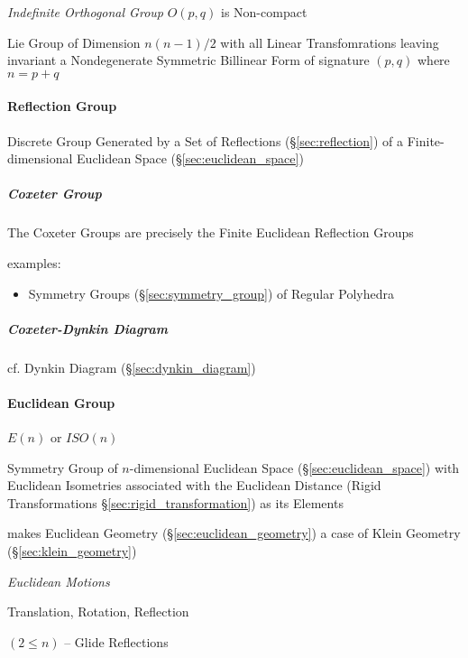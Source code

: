 \emph{Indefinite Orthogonal Group} $O(p,q)$ is Non-compact

Lie Group of Dimension $n(n-1)/2$ with all Linear Transfomrations leaving
invariant a Nondegenerate Symmetric Billinear Form of signature $(p,q)$ where
$n = p+q$



\paragraph{Reflection Group}\label{sec:reflection_group}\hfill

Discrete Group Generated by a Set of Reflections (\S\ref{sec:reflection}) of a
Finite-dimensional Euclidean Space (\S\ref{sec:euclidean_space})



\subparagraph{Coxeter Group}\label{sec:coxeter_group}\hfill

The Coxeter Groups are precisely the Finite Euclidean Reflection Groups

examples:
\begin{itemize}
  \item Symmetry Groups (\S\ref{sec:symmetry_group}) of Regular Polyhedra
\end{itemize}




\subparagraph{Coxeter-Dynkin Diagram}\label{sec:coxeter_dynkin_diagram}\hfill

cf. Dynkin Diagram (\S\ref{sec:dynkin_diagram})



\paragraph{Euclidean Group}\label{sec:euclidean_group}\hfill

$E(n)$ or $ISO(n)$

Symmetry Group of $n$-dimensional Euclidean Space (\S\ref{sec:euclidean_space})
with Euclidean Isometries associated with the Euclidean Distance (Rigid
Transformations \S\ref{sec:rigid_transformation}) as its Elements

makes Euclidean Geometry (\S\ref{sec:euclidean_geometry}) a case of
Klein Geometry (\S\ref{sec:klein_geometry})


\emph{Euclidean Motions}

Translation, Rotation, Reflection

$(2 \leq n)$ -- Glide Reflections

